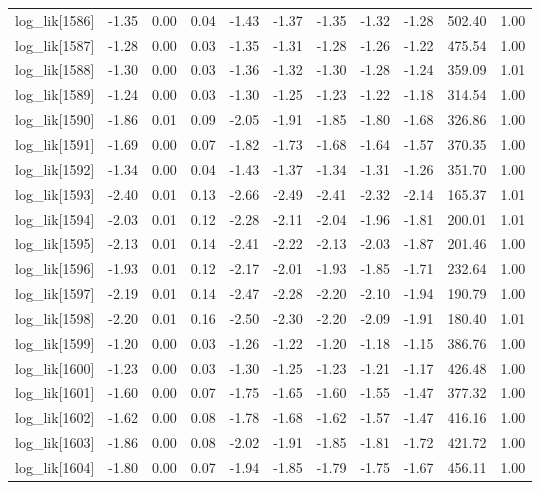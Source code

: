 \begin{table}[ht]
\begin{tabular}{rrrrrrrrrrr}
  log\_lik[1586] & -1.35 & 0.00 & 0.04 & -1.43 & -1.37 & -1.35 & -1.32 & -1.28 & 502.40 & 1.00 \\ 
  log\_lik[1587] & -1.28 & 0.00 & 0.03 & -1.35 & -1.31 & -1.28 & -1.26 & -1.22 & 475.54 & 1.00 \\ 
  log\_lik[1588] & -1.30 & 0.00 & 0.03 & -1.36 & -1.32 & -1.30 & -1.28 & -1.24 & 359.09 & 1.01 \\ 
  log\_lik[1589] & -1.24 & 0.00 & 0.03 & -1.30 & -1.25 & -1.23 & -1.22 & -1.18 & 314.54 & 1.00 \\ 
  log\_lik[1590] & -1.86 & 0.01 & 0.09 & -2.05 & -1.91 & -1.85 & -1.80 & -1.68 & 326.86 & 1.00 \\ 
  log\_lik[1591] & -1.69 & 0.00 & 0.07 & -1.82 & -1.73 & -1.68 & -1.64 & -1.57 & 370.35 & 1.00 \\ 
  log\_lik[1592] & -1.34 & 0.00 & 0.04 & -1.43 & -1.37 & -1.34 & -1.31 & -1.26 & 351.70 & 1.00 \\ 
  log\_lik[1593] & -2.40 & 0.01 & 0.13 & -2.66 & -2.49 & -2.41 & -2.32 & -2.14 & 165.37 & 1.01 \\ 
  log\_lik[1594] & -2.03 & 0.01 & 0.12 & -2.28 & -2.11 & -2.04 & -1.96 & -1.81 & 200.01 & 1.01 \\ 
  log\_lik[1595] & -2.13 & 0.01 & 0.14 & -2.41 & -2.22 & -2.13 & -2.03 & -1.87 & 201.46 & 1.00 \\ 
  log\_lik[1596] & -1.93 & 0.01 & 0.12 & -2.17 & -2.01 & -1.93 & -1.85 & -1.71 & 232.64 & 1.00 \\ 
  log\_lik[1597] & -2.19 & 0.01 & 0.14 & -2.47 & -2.28 & -2.20 & -2.10 & -1.94 & 190.79 & 1.00 \\ 
  log\_lik[1598] & -2.20 & 0.01 & 0.16 & -2.50 & -2.30 & -2.20 & -2.09 & -1.91 & 180.40 & 1.01 \\ 
  log\_lik[1599] & -1.20 & 0.00 & 0.03 & -1.26 & -1.22 & -1.20 & -1.18 & -1.15 & 386.76 & 1.00 \\ 
  log\_lik[1600] & -1.23 & 0.00 & 0.03 & -1.30 & -1.25 & -1.23 & -1.21 & -1.17 & 426.48 & 1.00 \\ 
  log\_lik[1601] & -1.60 & 0.00 & 0.07 & -1.75 & -1.65 & -1.60 & -1.55 & -1.47 & 377.32 & 1.00 \\ 
  log\_lik[1602] & -1.62 & 0.00 & 0.08 & -1.78 & -1.68 & -1.62 & -1.57 & -1.47 & 416.16 & 1.00 \\ 
  log\_lik[1603] & -1.86 & 0.00 & 0.08 & -2.02 & -1.91 & -1.85 & -1.81 & -1.72 & 421.72 & 1.00 \\ 
  log\_lik[1604] & -1.80 & 0.00 & 0.07 & -1.94 & -1.85 & -1.79 & -1.75 & -1.67 & 456.11 & 1.00 \\ 

\end{tabular}
\end{table}
